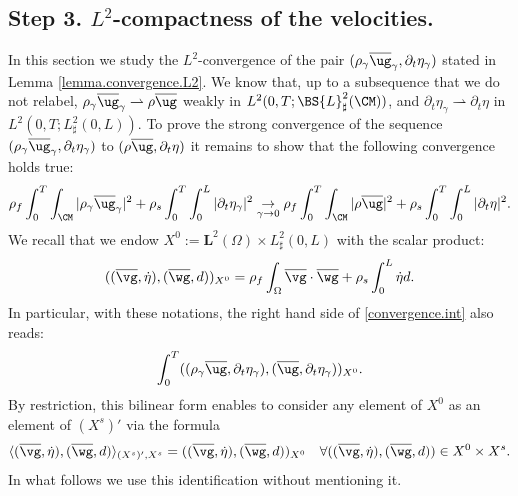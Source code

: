 \subsection{Step 3. $L^2$-compactness of the velocities.}

In this section we study the $L^{2}$\nobreakdash-convergence of the pair $(\rho_{\gamma}\overline{\ug}_{\gamma},\partial_{t}\eta_{\gamma})$ stated in Lemma \ref{lemma.convergence.L2}.
We know that, up to a subsequence that we do not relabel, $\rho_{\gamma}\overline{\ug}_{\gamma}\rightharpoonup\rho\overline{\ug}$ weakly in $L^{2}(0,T;\BS{L}_\sharp^{2}(\CM))$, and $\partial_t\eta_\gamma \rightharpoonup \partial_{t}\eta$ in $L^2(0,T;L^2_{\sharp}(0,L))$. To prove the strong convergence of the sequence $(\rho_{\gamma}\overline{\ug}_{\gamma},\partial_{t}\eta_{\gamma})$ to $(\rho\overline{\ug},\partial_{t}\eta)$ it remains to show that the following convergence holds true:
\begin{equation}\label{convergence.int}
\rho_{f}\int_{0}^{T}\int_{\CM}\vert \rho_{\gamma}\overline{\ug}_{\gamma}\vert^{2}+\rho_{s}\int_{0}^{T}\int_{0}^{L}\vert\partial_{t}\eta_{\gamma}\vert^{2}\underset{\gamma\to 0}{\to}\rho_{f}\int_{0}^{T}\int_{\CM}\vert \rho\overline{\ug}\vert^{2}+\rho_{s}\int_{0}^{T}\int_{0}^{L}\vert\partial_{t}\eta\vert^{2}.
\end{equation}
We recall that we endow $X^0 := \mathbf{L}^2(\Omega) \times L^2_{\sharp}(0,L)$ with the scalar product:
\[
((\overline{\vg},\dot{\eta}), (\overline{\wg},d))_{X^0} = \rho_f \int_{\Omega} \overline{\vg} \cdot \overline{\wg} + \rho_s \int_{0}^L \dot{\eta} d.
\]
In particular, with these notations, the right hand side of \eqref{convergence.int} also reads:
\[
\int_0^T ((\rho_{\gamma}\overline{\ug},\partial_t \eta_{\gamma}), (\overline{\ug},\partial_t \eta_{\gamma}))_{X^0}.
\]
By restriction, this bilinear form enables to consider any element of $X^0$ as an element of $(X^s)'$ via the formula
\begin{equation} \label{eq:embedX0}
\langle (\overline{\vg},\dot{\eta}), (\overline{\wg},d) \rangle_{(X^s)',X^s } = ((\overline{\vg},\dot{\eta}), (\overline{\wg},d))_{X^0}
\quad \forall ((\overline{\vg},\dot{\eta}),(\overline{\wg},d)) \in X^0 \times X^s.
\end{equation}
In what follows we use this identification without mentioning it.

